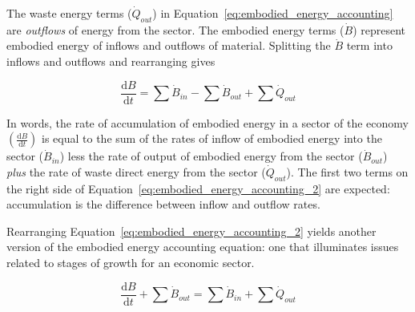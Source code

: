 The waste energy terms ($\dot{Q}_{out}$) 
in Equation~\ref{eq:embodied_energy_accounting}
are \emph{outflows} of energy from the sector. 
The embodied energy 
terms ($\dot{B}$) represent embodied energy of inflows
and outflows of material. Splitting the $\dot{B}$ term
into inflows and outflows and rearranging gives

\begin{equation} \label{eq:embodied_energy_accounting_2}
	\frac{\mathrm{d}B}{\mathrm{d}t}
	= \sum \dot{B}_{in}
	- \sum \dot{B}_{out} 
	+ \sum \dot{Q}_{out}
\end{equation}

In words, the rate of accumulation of embodied energy 
in a sector of the economy 
$\left( \frac{\mathrm{d}B}{\mathrm{d}t} \right)$ 
is equal to the sum of the rates of 
inflow of embodied energy into the sector 
	($\dot{B}_{in}$) 
less the rate of output of embodied energy from the sector 
	($\dot{B}_{out}$) 
\emph{plus} the rate of waste direct energy from the sector 
	($\dot{Q}_{out}$). 
The first two terms on the right side of
Equation~\ref{eq:embodied_energy_accounting_2} are expected: 
accumulation is the difference between inflow and outflow rates. 

Rearranging Equation~\ref{eq:embodied_energy_accounting_2}
yields another version of the embodied energy accounting equation:
one that illuminates issues related to 
stages of growth for an economic sector.

\begin{equation} \label{eq:embodied_energy_accounting_3}
	\frac{\mathrm{d}B}{\mathrm{d}t} 
	+ \sum \dot{B}_{out}
	= \sum \dot{B}_{in}
	+ \sum \dot{Q}_{out}
\end{equation}

